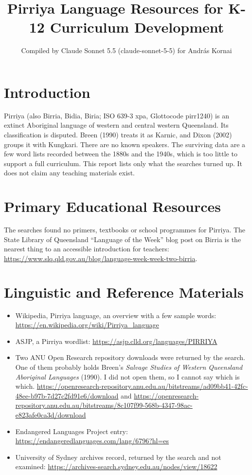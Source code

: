 \documentclass[12pt]{article}
\title{Pirriya Language Resources for K-12 Curriculum Development}
\author{Compiled by Claude Sonnet 5.5 (claude-sonnet-5-5) for Andr\'as Kornai}
\date{}
\begin{document}
\maketitle

\section{Introduction}
Pirriya (also Birria, Bidia, Biria; ISO 639-3 xpa, Glottocode pirr1240) is an extinct Aboriginal language of western and central western Queensland. Its classification is disputed. Breen (1990) treats it as Karnic, and Dixon (2002) groups it with Kungkari. There are no known speakers. The surviving data are a few word lists recorded between the 1880s and the 1940s, which is too little to support a full curriculum. This report lists only what the searches turned up. It does not claim any teaching materials exist.

\section{Primary Educational Resources}
The searches found no primers, textbooks or school programmes for Pirriya. The State Library of Queensland ``Language of the Week'' blog post on Birria is the nearest thing to an accessible introduction for teachers: \url{https://www.slq.qld.gov.au/blog/language-week-week-two-birria}.

\section{Linguistic and Reference Materials}
\begin{itemize}
\item Wikipedia, Pirriya language, an overview with a few sample words: \url{https://en.wikipedia.org/wiki/Pirriya_language}
\item ASJP, a Pirriya wordlist: \url{https://asjp.clld.org/languages/PIRRIYA}
\item Two ANU Open Research repository downloads were returned by the search. One of them probably holds Breen's \emph{Salvage Studies of Western Queensland Aboriginal Languages} (1990). I did not open them, so I cannot say which is which. \url{https://openresearch-repository.anu.edu.au/bitstreams/ad09bb41-42fc-48ee-b97b-7d27c2fd91e6/download} and \url{https://openresearch-repository.anu.edu.au/bitstreams/8c107f99-568b-4347-98ac-e823afe0ca3d/download}
\item Endangered Languages Project entry: \url{https://endangeredlanguages.com/lang/6796?hl=es}
\item University of Sydney archives record, returned by the search and not examined: \url{https://archives-search.sydney.edu.au/nodes/view/18622}
\end{itemize}
\end{document}
